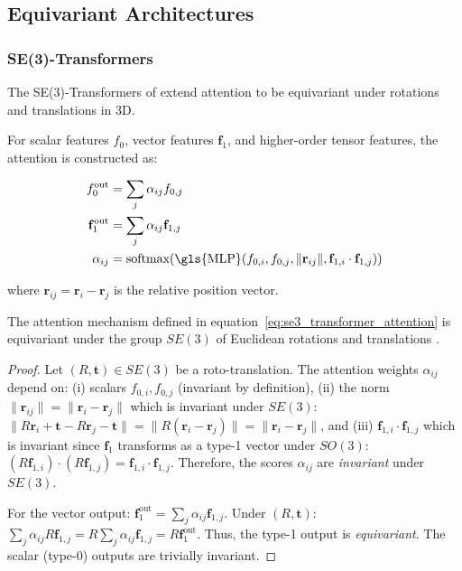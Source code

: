 \subsection{Equivariant Architectures}\label{sec:equivariant_transformers}

\subsubsection[SE(3)-Transformers]{SE(3)-\glspl{Transformer}}

The SE(3)-\glspl{Transformer} of \citet{fuchs2020se3transformers} extend attention to be equivariant under rotations and translations in 3D.

For scalar features $f_0$, vector features $\mathbf{f}_1$, and higher-order tensor features, the attention is constructed as:

\begin{align}
    f_0^{\text{out}} &= \sum_j \alpha_{ij} f_{0,j} \\
    \mathbf{f}_1^{\text{out}} &= \sum_j \alpha_{ij} \mathbf{f}_{1,j} \\
    \alpha_{ij} &= \text{softmax}(\text{\gls{MLP}}(f_{0,i}, f_{0,j}, \|\mathbf{r}_{ij}\|, \mathbf{f}_{1,i} \cdot \mathbf{f}_{1,j}))
    \label{eq:se3_transformer_attention}
\end{align}

where $\mathbf{r}_{ij} = \mathbf{r}_i - \mathbf{r}_j$ is the relative position vector.

\begin{theorem}
    The attention mechanism defined in equation~\eqref{eq:se3_transformer_attention} is equivariant under the group $SE(3)$ of Euclidean rotations and translations \citep{fuchs2020se3transformers}.
\end{theorem}

\begin{proof}
Let $(R, \mathbf{t}) \in SE(3)$ be a roto-translation. The attention weights $\alpha_{ij}$ depend on: (i) scalars $f_{0,i}, f_{0,j}$ (invariant by definition), (ii) the norm $\|\mathbf{r}_{ij}\| = \|\mathbf{r}_i - \mathbf{r}_j\|$ which is invariant under $SE(3)$: $\|R\mathbf{r}_i + \mathbf{t} - R\mathbf{r}_j - \mathbf{t}\| = \|R(\mathbf{r}_i - \mathbf{r}_j)\| = \|\mathbf{r}_i - \mathbf{r}_j\|$, and (iii) $\mathbf{f}_{1,i} \cdot \mathbf{f}_{1,j}$ which is invariant since $\mathbf{f}_1$ transforms as a type-1 vector under $SO(3)$: $(R\mathbf{f}_{1,i}) \cdot (R\mathbf{f}_{1,j}) = \mathbf{f}_{1,i} \cdot \mathbf{f}_{1,j}$. Therefore, the scores $\alpha_{ij}$ are \emph{invariant} under $SE(3)$.

For the vector output: $\mathbf{f}_1^{\text{out}} = \sum_j \alpha_{ij} \mathbf{f}_{1,j}$. Under $(R, \mathbf{t})$: $\sum_j \alpha_{ij} R\mathbf{f}_{1,j} = R \sum_j \alpha_{ij} \mathbf{f}_{1,j} = R \mathbf{f}_1^{\text{out}}$. Thus, the type-1 output is \emph{equivariant}. The scalar (type-0) outputs are trivially invariant.
\end{proof}

